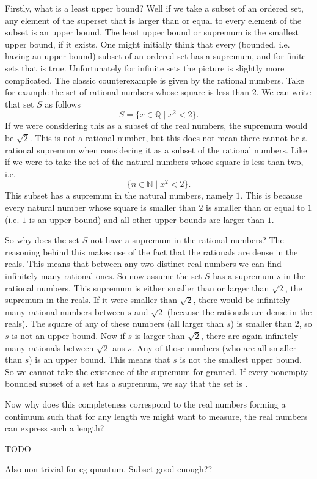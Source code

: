 \begin{enumerate}
Firstly, what is a least upper bound? Well if we take a subset of an ordered set, any element of the superset that is larger than or equal to every element of the subset is an upper bound. The least upper bound or supremum is the smallest upper bound, if it exists. One might initially think that every (bounded, i.e. having an upper bound) subset of an ordered set has a supremum, and for finite sets that is true. Unfortunately for infinite sets the picture is slightly more complicated. The classic counterexample is given by the rational numbers. Take for example the set of rational numbers whose square is less than $2$. We can write that set $S$ as follows
\[ S = \{x\in \mathbb{Q} \;|\; x^2 < 2\}. \]
If we were considering this as a subset of the real numbers, the supremum would be $\sqrt{2}$. This is not a rational number, but this does not mean there cannot be a rational supremum when considering it as a subset of the rational numbers. Like if we were to take the set of the natural numbers whose square is less than two, i.e.
\[ \{ n \in \mathbb{N} \;|\; x^2 < 2 \}. \]
This subset has a supremum in the natural numbers, namely $1$. This is because every natural number whose square is smaller than $2$ is smaller than or equal to $1$ (i.e. $1$ is an upper bound) and all other upper bounds are larger than $1$.

So why does the set $S$ not have a supremum in the rational numbers? The reasoning behind this makes use of the fact that the rationals are dense in the reals. This means that between any two distinct real numbers we can find infinitely many rational ones. So now assume the set $S$ has a supremum $s$ in the rational numbers. This supremum is either smaller than or larger than $\sqrt{2}$, the supremum in the reals. If it were smaller than $\sqrt{2}$, there would be infinitely many rational numbers between $s$ and $\sqrt{2}$ (because the rationals are dense in the reals). The square of any of these numbers (all larger than $s$) is smaller than $2$, so $s$ is not an upper bound. Now if $s$ is larger than $\sqrt{2}$, there are again infinitely many rationals between $\sqrt{2}$ ans $s$. Any of those numbers (who are all smaller than $s$) is an upper bound. This means that $s$ is not the smallest upper bound. So we cannot take the existence of the supremum for granted. If every nonempty bounded subset of a set has a supremum, we say that the set is . 

Now why does this completeness correspond to the real numbers forming a continuum such that for any length we might want to measure, the real numbers can express such a length? 

TODO

Also non-trivial for eg quantum. Subset good enough??



\end{enumerate}

